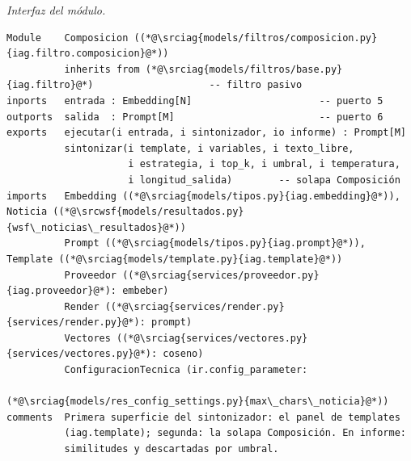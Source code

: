 \documentclass[12pt]{report}
\newcommand{\wsfrepo}{https://github.com/wsf/wsfnoticias}
\newcommand{\wsfref}{aa59c466581c0ce83c16f88f63d6021e9039fbcd}
\newcommand{\srcwsf}[2]{\href{\wsfrepo/blob/\wsfref/#1}{#2}}
\newcommand{\iagrepo}{https://github.com/lbassani12/noticias_iag}
\newcommand{\iagref}{bca7dba0bc76cf5533bd8df1d9a27493d498942d}
\newcommand{\srciag}[2]{\href{\iagrepo/blob/\iagref/#1}{#2}}
\begin{document}
\noindent\begin{minipage}{\linewidth}
  \textit{Interfaz del módulo.}
  \begin{lstlisting}[style=implbloque]
Module    Composicion ((*@\srciag{models/filtros/composicion.py}{iag.filtro.composicion}@*))
          inherits from (*@\srciag{models/filtros/base.py}{iag.filtro}@*)                    -- filtro pasivo
inports   entrada : Embedding[N]                      -- puerto 5
outports  salida  : Prompt[M]                         -- puerto 6
exports   ejecutar(i entrada, i sintonizador, io informe) : Prompt[M]
          sintonizar(i template, i variables, i texto_libre,
                     i estrategia, i top_k, i umbral, i temperatura,
                     i longitud_salida)        -- solapa Composición
imports   Embedding ((*@\srciag{models/tipos.py}{iag.embedding}@*)), Noticia ((*@\srcwsf{models/resultados.py}{wsf\_noticias\_resultados}@*))
          Prompt ((*@\srciag{models/tipos.py}{iag.prompt}@*)), Template ((*@\srciag{models/template.py}{iag.template}@*))
          Proveedor ((*@\srciag{services/proveedor.py}{iag.proveedor}@*): embeber)
          Render ((*@\srciag{services/render.py}{services/render.py}@*): prompt)
          Vectores ((*@\srciag{services/vectores.py}{services/vectores.py}@*): coseno)
          ConfiguracionTecnica (ir.config_parameter:
                                (*@\srciag{models/res_config_settings.py}{max\_chars\_noticia}@*))
comments  Primera superficie del sintonizador: el panel de templates
          (iag.template); segunda: la solapa Composición. En informe:
          similitudes y descartadas por umbral.
\end{lstlisting}
\end{minipage}
\end{document}
